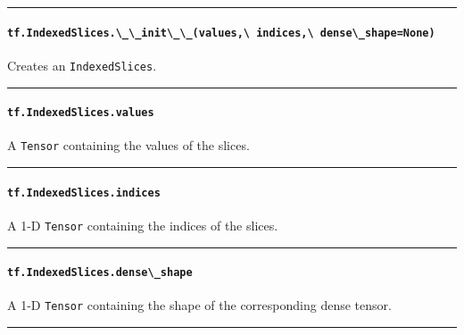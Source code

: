 \begin{center}\rule{0.5\linewidth}{\linethickness}\end{center}

\paragraph{\texorpdfstring{\lstinline{tf.IndexedSlices.\_\_init\_\_(values,\ indices,\ dense\_shape=None)}
}{tf.IndexedSlices.\_\_init\_\_(values, indices, dense\_shape=None) }}\label{tf.indexedslices.ux5fux5finitux5fux5fvalues-indices-denseux5fshapenone}

Creates an \lstinline{IndexedSlices}.

\begin{center}\rule{0.5\linewidth}{\linethickness}\end{center}

\paragraph{\texorpdfstring{\lstinline{tf.IndexedSlices.values}
}{tf.IndexedSlices.values }}\label{tf.indexedslices.values}

A \lstinline{Tensor} containing the values of the slices.

\begin{center}\rule{0.5\linewidth}{\linethickness}\end{center}

\paragraph{\texorpdfstring{\lstinline{tf.IndexedSlices.indices}
}{tf.IndexedSlices.indices }}\label{tf.indexedslices.indices}

A 1-D \lstinline{Tensor} containing the indices of the slices.

\begin{center}\rule{0.5\linewidth}{\linethickness}\end{center}

\paragraph{\texorpdfstring{\lstinline{tf.IndexedSlices.dense\_shape}
}{tf.IndexedSlices.dense\_shape }}\label{tf.indexedslices.denseux5fshape}

A 1-D \lstinline{Tensor} containing the shape of the corresponding dense
tensor.

\begin{center}\rule{0.5\linewidth}{\linethickness}\end{center}

